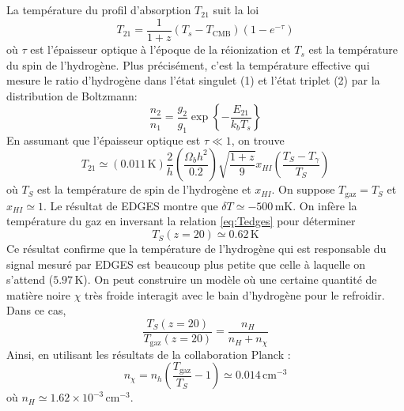 \documentclass{article}
\numberwithin{equation}{section}
\begin{document}
\subsection{}
La température du profil d'absorption $T_{21}$ suit la loi
\[
        T_{21} = \frac{1}{1 + z}(T_s - T_{\text{CMB}})(1 - e^{-\tau})
\]
où $\tau$ est l'épaisseur optique à l'époque de la réionization et $T_s$ est la 
température du spin de l'hydrogène. Plus précisément, c'est la température 
effective qui mesure le ratio d'hydrogène dans l'état singulet (1) et l'état 
triplet (2) par la distribution de Boltzmann:
\begin{equation}\label{eq:Tspin} 
       \frac{n_2}{n_1} = \frac{g_2}{g_1}\exp \left\{ -\frac{E_{21}}{k_bT_s} \right\} 
\end{equation} 
En assumant que l'épaisseur optique est $\tau \ll 1$, on trouve \cite{Madau1996}
\begin{equation}\label{eq:Tedges} 
        T_{21} \simeq (0.011\, \text{K})\frac{2}{h}\left( \frac{\Omega_b h^2}{0.2} \right)
        \sqrt{\frac{1 + z}{9}} x_{HI} \left( \frac{T_S - T_\gamma}{T_S} \right)
\end{equation} 
où $T_S$ est la température de spin de l'hydrogène et $x_{HI}$. On suppose $T_{\text{gaz}} = T_S$ 
et $x_{HI} \simeq 1$.
Le résultat de EDGES montre que $\delta T\simeq -500\, \text{mK}$. On infère la 
température du gaz en inversant la relation \ref{eq:Tedges} pour déterminer 
\[
        T_S(z=20) \simeq 0.62\, \text{K}
\]
Ce résultat confirme que la température de l'hydrogène qui est responsable 
du signal mesuré par EDGES est beaucoup plus petite que celle à laquelle on 
s'attend ($5.97\, \text{K}$). On peut construire un modèle où une certaine 
quantité de matière noire $\chi$ très froide interagit avec le bain d'hydrogène 
pour le refroidir. Dans ce cas,
\[
        \frac{T_{S}(z = 20)}{T_{\text{gaz}}(z=20)} = \frac{n_H}{n_H + n_\chi}
\]
Ainsi, en utilisant les résultats de la collaboration Planck \cite{PlanckCollaboration2018}:
\[
        \boxed{n_\chi = n_h \left( \frac{T_{\text{gaz}}}{T_S} - 1 \right) 
        \simeq  0.014\, \text{cm}^{-3}}
\]
où $n_H \simeq 1.62\times 10^{-3}\, \text{cm}^{-3}$.



\end{document}
